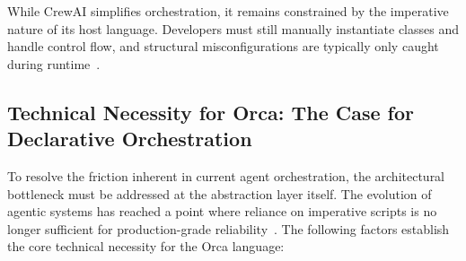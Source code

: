 \documentclass[sigconf,nonacm]{acmart}
\begin{document}
While CrewAI simplifies orchestration, it remains constrained by the
imperative nature of its host language. Developers must still manually
instantiate classes and handle control flow, and structural
misconfigurations are typically only caught during runtime~\cite{crewai2024}.

\subsection{Technical Necessity for Orca: The Case for Declarative Orchestration}
\label{sec:litreview:necessity}

To resolve the friction inherent in current agent orchestration, the
architectural bottleneck must be addressed at the abstraction layer itself.
The evolution of agentic systems has reached a point where reliance on
imperative scripts is no longer sufficient for production-grade
reliability~\cite{docker2025cagent,manias2024skills}. The following factors
establish the core technical necessity for the Orca language:
\end{document}
